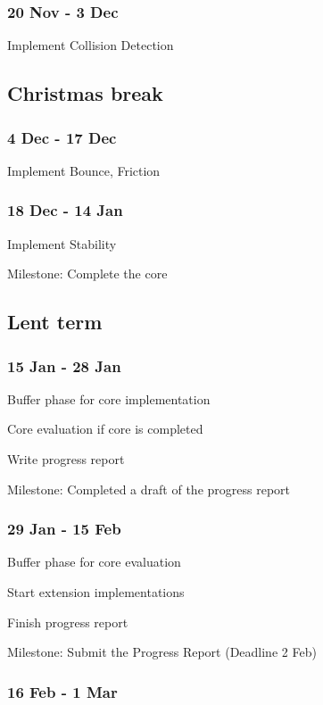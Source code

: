 \documentclass[12pt,a4paper,twoside]{article}
\begin{document}
\subsubsection*{20 Nov - 3 Dec}

Implement Collision Detection

\subsection*{Christmas break}

\subsubsection*{4 Dec - 17 Dec}

Implement Bounce, Friction

\subsubsection*{18 Dec - 14 Jan}

Implement Stability

Milestone: Complete the core

\subsection*{Lent term}

\subsubsection*{15 Jan - 28 Jan}

Buffer phase for core implementation

Core evaluation if core is completed

Write progress report

Milestone: Completed a draft of the progress report

\subsubsection*{29 Jan - 15 Feb}

Buffer phase for core evaluation

Start extension implementations

Finish progress report

Milestone: Submit the Progress Report (Deadline 2 Feb)

\subsubsection*{16 Feb - 1 Mar}
\end{document}

